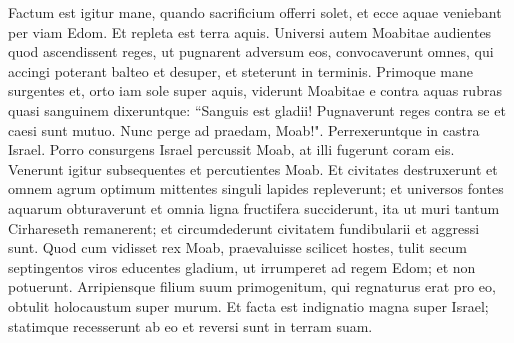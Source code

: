 \begin{biblechapter}
\verse Factum est igitur mane, quando sacrificium offerri solet, et ecce aquae veniebant per viam Edom. Et repleta est terra aquis. 
\verse Universi autem Moabitae audientes quod ascendissent reges, ut pugnarent adversum eos, convocaverunt omnes, qui accingi poterant balteo et desuper, et steterunt in terminis. 
\verse Primoque mane surgentes et, orto iam sole super aquis, viderunt Moabitae e contra aquas rubras quasi sanguinem 
\verse dixeruntque: “Sanguis est gladii! Pugnaverunt reges contra se et caesi sunt mutuo. Nunc perge ad praedam, Moab!". 
\verse Perrexeruntque in castra Israel. Porro consurgens Israel percussit Moab, at illi fugerunt coram eis. Venerunt igitur subsequentes et percutientes Moab. 
\verse Et civitates destruxerunt et omnem agrum optimum mittentes singuli lapides repleverunt; et universos fontes aquarum obturaverunt et omnia ligna fructifera succiderunt, ita ut muri tantum Cirhareseth remanerent; et circumdederunt civitatem fundibularii et aggressi sunt. 
\verse Quod cum vidisset rex Moab, praevaluisse scilicet hostes, tulit secum septingentos viros educentes gladium, ut irrumperet ad regem Edom; et non potuerunt. 
\verse Arripiensque filium suum primogenitum, qui regnaturus erat pro eo, obtulit holocaustum super murum. Et facta est indignatio magna super Israel; statimque recesserunt ab eo et reversi sunt in terram suam. 
\end{biblechapter}

